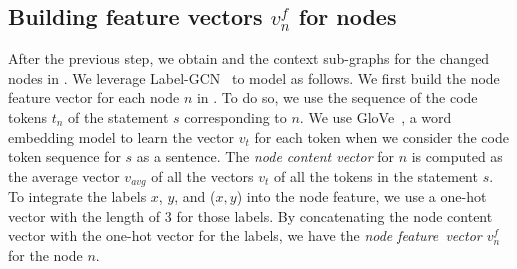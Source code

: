 \subsection{Building feature vectors $v^{f}_n$ for {\mvpdgxy} nodes}
\label{feature:sec}

After the previous step, we obtain {\mvpdgxy} and the context
sub-graphs for the changed nodes in {\mvpdgxy}. We leverage
Label-GCN~\cite{label-gcn} to model {\mvpdgxy} as follows. We first
build the node feature vector for each node $n$ in {\mvpdgxy}. To do
so, we use the sequence of the code tokens $t_n$ of the statement $s$
corresponding to $n$. We use GloVe~\cite{glove2014}, a word embedding
model to learn the vector $v_t$ for each token when we consider the
code token sequence for $s$ as a sentence. The {\em node content
  vector} for $n$ is computed as the average vector $v_{avg}$ of
all the vectors $v_t$ of all the tokens in the statement $s$.
%
To integrate the labels $x$, $y$, and ($x,y$) into the node feature,
we use a one-hot vector with the length of 3 for those labels. By
concatenating the node content vector with the one-hot vector for the
labels, we have the {\em node feature~vector $v^{f}_n$} for the node
$n$. 




